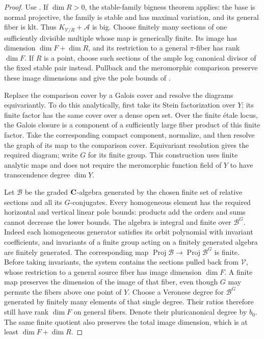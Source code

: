 \begin{proof}
Use .  If \(\dim R>0\), the
stable-family bigness theorem
\cite[Theorem~8.1 and Corollary~8.3]{KovacsPatakfalvi} applies:
the base is normal projective, the family is stable and has
maximal variation, and its general fiber is klt.
Thus \(K_{\mathcal V/R}+\mathcal A\) is big.
Choose finitely many sections of one sufficiently divisible
multiple whose map is generically finite.  Its image has dimension
\(\dim F+\dim R\), and its restriction to a general \(\pi\)-fiber
has rank \(\dim F\).  If \(R\) is a point, choose such
sections of the ample log canonical divisor of the fixed stable
pair instead.  Pullback and the meromorphic comparison preserve these
image dimensions and give the pole bounds of
.

Replace the comparison cover by a Galois cover and resolve the
diagrams equivariantly.  To do this analytically, first take its Stein
factorization over \(Y\); its finite factor has the same cover over a
dense open set.  Over the finite étale locus, the Galois closure is a
component of a sufficiently large fiber product of this finite factor.
Take the corresponding compact component, normalize, and then resolve
the graph of its map to the comparison cover.  Equivariant resolution
gives the required diagram; write \(G\) for its finite group.
This construction uses finite analytic maps and does not require the
meromorphic function field of \(Y\) to have transcendence degree
\(\dim Y\).

Let \(\mathcal B\) be the graded \(\mathbf C\)-algebra generated by the
chosen finite set of relative sections and all its \(G\)-conjugates.
Every homogeneous element has the required horizontal and vertical
linear pole bounds: products add the orders and sums cannot
decrease the lower bounds.  The algebra is integral and finite over
\(\mathcal B^G\).  Indeed each homogeneous generator satisfies its
orbit polynomial with invariant coefficients, and invariants of
a finite group acting on a finitely generated algebra are finitely
generated.  The corresponding map
\(\operatorname{Proj}\mathcal B\to\operatorname{Proj}\mathcal B^G\)
is finite.  Before taking invariants, the system contains the sections
pulled back from \(\mathcal V\), whose restriction to a general source
fiber has image dimension \(\dim F\).  A finite map preserves the
dimension of the image of that fiber, even though \(G\) may permute
the fibers above one point of \(Y\).  Choose a Veronese degree for
\(\mathcal B^G\) generated by finitely many elements of that single
degree.  Their ratios therefore still have rank \(\dim F\) on general
fibers.  Denote their pluricanonical degree by \(b_0\).
The same finite quotient also preserves the total image dimension,
which is at least \(\dim F+\dim R\).


\end{proof}
